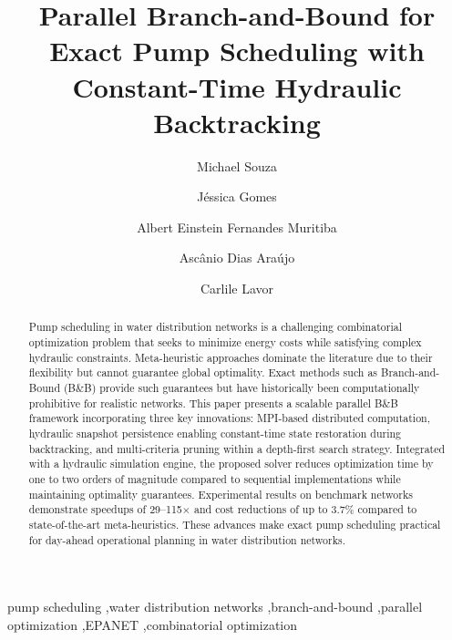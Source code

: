 \documentclass[final,3p,twocolumn]{elsarticle}
\begin{document}
\begin{frontmatter}

	\title{Parallel Branch-and-Bound for Exact Pump Scheduling with Constant-Time Hydraulic Backtracking}

	\author[ufc]{Michael Souza}

	\author[ufc]{Jéssica Gomes}

	\author[ufc]{Albert Einstein Fernandes Muritiba}

	\author[ufc]{Ascânio Dias Araújo}

	\author[unicamp]{Carlile Lavor}




	\begin{abstract}
		Pump scheduling in water distribution networks is a challenging combinatorial optimization problem that seeks to minimize energy costs while satisfying complex hydraulic constraints. Meta-heuristic approaches dominate the literature due to their flexibility but cannot guarantee global optimality. Exact methods such as Branch-and-Bound (B\&B) provide such guarantees but have historically been computationally prohibitive for realistic networks. This paper presents a scalable parallel B\&B framework incorporating three key innovations: MPI-based distributed computation, hydraulic snapshot persistence enabling constant-time state restoration during backtracking, and multi-criteria pruning within a depth-first search strategy. Integrated with a hydraulic simulation engine, the proposed solver reduces optimization time by one to two orders of magnitude compared to sequential implementations while maintaining optimality guarantees. Experimental results on benchmark networks demonstrate speedups of 29--115$\times$ and cost reductions of up to 3.7\% compared to state-of-the-art meta-heuristics. These advances make exact pump scheduling practical for day-ahead operational planning in water distribution networks.
	\end{abstract}

	\begin{keyword}
		pump scheduling \sep water distribution networks \sep branch-and-bound \sep parallel optimization \sep EPANET \sep combinatorial optimization
	\end{keyword}

\end{frontmatter}
\end{document}
